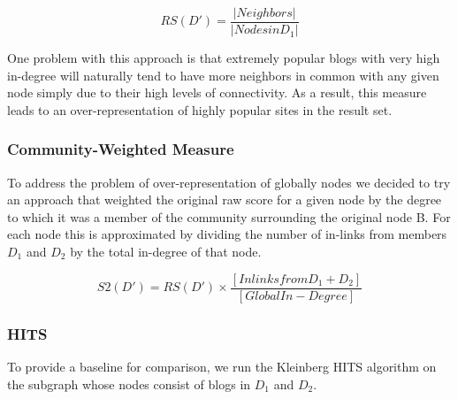 \documentclass{sig-alternate}
\begin{document}
\begin{equation}
RS(D') = \frac{\lvert Neighbors \rvert}{\lvert Nodes in D_1 \rvert}
\end{equation}

One problem with this approach is that extremely popular blogs with
very high in-degree will naturally tend to have more neighbors in
common with any given node simply due to their high levels of
connectivity.  As a result, this measure leads to an
over-representation of highly popular sites in the result set.

\subsubsection{Community-Weighted Measure}
To address the problem of over-representation of globally 
nodes we decided to try an approach that weighted the original raw
score for a given node by the degree to which it was a member of the
community surrounding the original node B.  For each node this is
approximated by dividing the number of in-links from members $D_1$ and $D_2$
by the total in-degree of that node.

\begin{equation}
S2(D') = RS(D') \times \frac{[Inlinks from D_1 + D_2]}{[ Global In-Degree]}
\end{equation}

\subsubsection{HITS}
To provide a baseline for comparison, we run the Kleinberg HITS
algorithm on the subgraph whose nodes consist of blogs in $D_1$ and
$D_2$.
\end{document}
